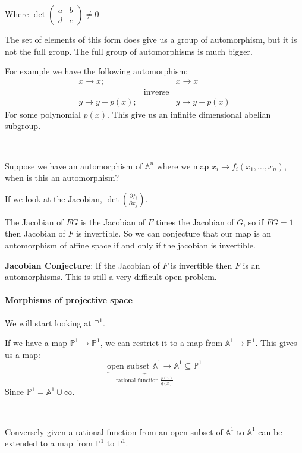 Where $\det \begin{pmatrix}
    a&b\\d&e
\end{pmatrix}\neq 0$

The set of elements of this form does give us a group of automorphism, but it is not the full group. The full group of automorphisms is much bigger.

For example we have the following automorphism:\[\begin{array}{ccc}
    x\rightarrow x; & &x\rightarrow x\\
    &\text{inverse}&\\
    y\rightarrow y+p(x);&&y\rightarrow y-p(x)
\end{array}\]
For some polynomial $p(x)$. This give us an infinite dimensional abelian subgroup.

\

Suppose we have an automorphism of $\mathbb{A}^n$ where we map $x_i\rightarrow f_i(x_1,\ldots,x_n)$, when is this an automorphism? 

If we look at the Jacobian, $\det(\frac{\partial f_i}{\partial x_j})$. 

The Jacobian of $FG$ is the Jacobian of $F$ times the Jacobian of $G$, so if $FG = 1$ then Jacobian of $F$ is invertible. So we can conjecture that our map is an automorphism of affine space if and only if the jacobian is invertible.

\textbf{Jacobian Conjecture}: If the Jacobian of $F$ is invertible then $F$ is an automorphisms. This is still a very difficult open problem.


\paragraph*{Morphisms of projective space}

We will start looking at $\mathbb{P}^1$.

If we have a map $\mathbb{P}^1\rightarrow \mathbb{P}^1$, we can restrict it to a map from $\mathbb{A}^1\rightarrow \mathbb{P}^1$. This gives us a map:\[\underbrace{\text{open subset }\mathbb{A}^1\rightarrow \mathbb{A}^1}_{\text{rational function } \frac{p(x)}{q(x)}}\subseteq \mathbb{P}^1\]
Since $\mathbb{P}^1 = \mathbb{A}^1\cup \infty$.

\

Conversely given a rational function from an open subset of $\mathbb{A}^1$ to $\mathbb{A}^1$ can be extended to a map from $\mathbb{P}^1$ to $\mathbb{P}^1$.

